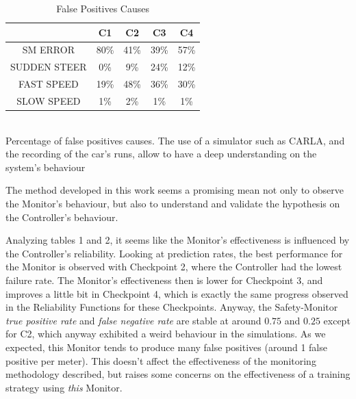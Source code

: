 \begin{table}
	\caption{False Positives Causes}
	\begin{center}
		\begin{tabular}{ |c|c|c|c|c| }
			\hline
			  & C1 & C2 & C3 & C4 \\
			\hline
			SM ERROR & 80\% & 41\% & 39\% & 57\% \\
			\hline
			SUDDEN STEER & 0\% & 9\% & 24\% & 12\% \\
			\hline
			FAST SPEED & 19\% & 48\% & 36\% & 30\% \\
			\hline
			SLOW SPEED & 1\% & 2\% & 1\% & 1\% \\
			\hline
		\end{tabular}
	\\
	\vspace{0.3cm}
	Percentage of false positives causes. The use of a simulator such as CARLA, and the recording of the car's runs, allow to have a deep understanding on the system's behaviour
	\end{center}
\end{table}

The method developed in this work seems a promising mean not only to observe the Monitor's behaviour, but also to understand and validate the hypothesis on the Controller's behaviour.

Analyzing tables 1 and 2, it seems like the Monitor's effectiveness is influenced by the Controller's reliability. Looking at prediction rates, the best performance for the Monitor is observed with Checkpoint 2, where the Controller had the lowest failure rate. The Monitor's effectiveness then is lower for Checkpoint 3, and improves a little bit in Checkpoint 4, which is exactly the same progress observed in the Reliability Functions for these Checkpoints. Anyway, the Safety-Monitor \textsl{true positive rate} and \textsl{false negative rate} are stable at around $0.75$ and $0.25$ except for C2, which anyway exhibited a weird behaviour in the simulations. As we expected, this Monitor tends to produce many false positives (around 1 false positive per meter). This doesn't affect the effectiveness of the monitoring methodology described, but raises some concerns on the effectiveness of a training strategy using \textsl{this} Monitor.\newline

